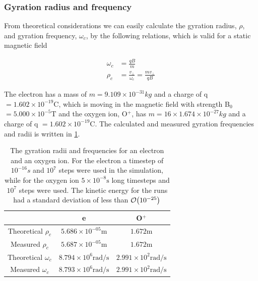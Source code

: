 \documentclass[x11names]{article}
\begin{document}
      \subsubsection{Gyration radius and frequency}
            From theoretical considerations we can easily calculate the gyration radius, \(\rho\), and gyration frequency, \( \omega_c \), by the following relations, which is valid for a static magnetic field

            \begin{align}
                  \omega_c    &= \frac{qB}{m} \\
                  \rho_c      &= \frac{v_\perp}{\omega_c} = \frac{mv_\perp}{qB}
            \end{align}

            The electron has a mass of \(m = 9.109 \times 10^{-31} \si{kg}\) and a charge of q \( = 1.602\times 10^{-19} \si{\coulomb} \), which is moving in the magnetic field with strength B\(_0\) \( = 5.000 \times 10^ {-5} \si{\tesla}\) and the oxygen ion,  O\(^{+}\), has \(m = 16 \times 1.674 \times 10^{-27} \si{kg}\) and a charge of q \( = 1.602\times 10^{-19} \si{\coulomb} \). The calculated and measured gyration frequencies and radii is written in \cref{tab:results}.




            \begin{table}
                  \centering
                  \begin{tabular}{| c |c | c |}
                        \hline
                                                & e   & O$^+$
                        \\ \hline
                        Theoretical $\rho_c$    &  $5.686 \times 10^{-05} \si{\meter}$   &    $1.672  \si{\meter}$ 
                        \\ \hline
                        Measured $\rho_c$       &  $5.687 \times 10^{-05} \si{\meter}$  &     $1.672 \si{\meter}$ 
                        \\ \hline
                        Theoretical \(\omega_c\)&  $8.794 \times 10^{6} \si{ \radian\per\second} $  & $ 2.991 \times 10 ^{2}\si{ \radian\per\second} $
                        \\ \hline
                        Measured \(\omega_c\)   &  $ 8.793\times 10^{6} \si{ \radian\per\second}$  &  $ 2.991 \times 10 ^{2} \si{ \radian\per\second}$
                        \\ \hline
                  \end{tabular}
                  \caption{The gyration radii and frequencies for an electron and an oxygen ion. For the electron a timestep of \( 10^{-16} \si{s} \) and \(10^7\) steps were used in the simulation, while for the oxygen ion \( 5\times 10^{-8} \si{\second } \) long timesteps and \(10^7\) steps were used. The kinetic energy for the runs had a standard deviation of less than \(\order{10^{-25}}\)}
                  \label{tab:results}
            \end{table}
\end{document}
